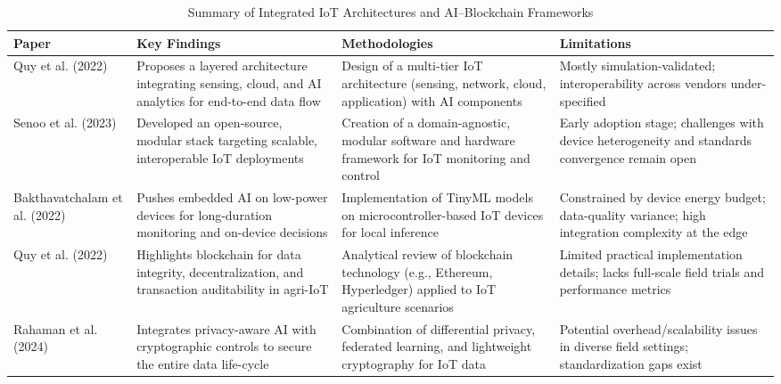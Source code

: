 \documentclass[12pt,onecolumn]{IEEEtran} %
\newcommand{\fitToPage}[1]{\begin{adjustbox}{max width=\textwidth}#1\end{adjustbox}}
\renewcommand{\arraystretch}{1.2} %
\begin{document}
\begin{table}[H]
\caption{Summary of Integrated IoT Architectures and AI–Blockchain Frameworks}
\label{tab:summary-iot-ai-bc}
\centering
\fitToPage{
\begingroup
\setlength{\tabcolsep}{4pt}
\renewcommand{\arraystretch}{1.15}
\footnotesize
\begin{tabularx}{\textwidth}{@{}P{0.18\textwidth}YYY@{}}
\toprule
\textbf{Paper} & \textbf{Key Findings} & \textbf{Methodologies} & \textbf{Limitations} \\
\midrule
Quy et al. (2022) & Proposes a layered architecture integrating sensing, cloud, and AI analytics for end-to-end data flow & Design of a multi-tier IoT architecture (sensing, network, cloud, application) with AI components & Mostly simulation-validated; interoperability across vendors under-specified \\
\addlinespace
Senoo et al. (2023) & Developed an open-source, modular stack targeting scalable, interoperable IoT deployments & Creation of a domain-agnostic, modular software and hardware framework for IoT monitoring and control & Early adoption stage; challenges with device heterogeneity and standards convergence remain open \\
\addlinespace
Bakthavatchalam et al. (2022) & Pushes embedded AI on low-power devices for long-duration monitoring and on-device decisions & Implementation of TinyML models on microcontroller-based IoT devices for local inference & Constrained by device energy budget; data-quality variance; high integration complexity at the edge \\
\addlinespace
Quy et al. (2022) & Highlights blockchain for data integrity, decentralization, and transaction auditability in agri-IoT & Analytical review of blockchain technology (e.g., Ethereum, Hyperledger) applied to IoT agriculture scenarios & Limited practical implementation details; lacks full-scale field trials and performance metrics \\
\addlinespace
Rahaman et al. (2024) & Integrates privacy-aware AI with cryptographic controls to secure the entire data life-cycle & Combination of differential privacy, federated learning, and lightweight cryptography for IoT data & Potential overhead/scalability issues in diverse field settings; standardization gaps exist \\
\bottomrule
\end{tabularx}
\endgroup
}
\end{table}
\end{document}
